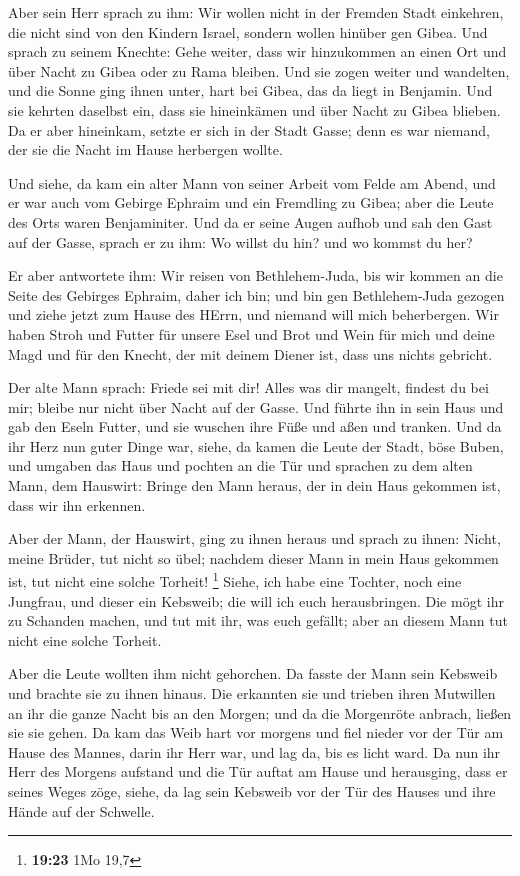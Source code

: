  Aber sein Herr sprach zu ihm: Wir wollen nicht in der
Fremden Stadt einkehren, die nicht sind von den Kindern Israel, sondern
wollen hinüber gen Gibea.  Und sprach zu seinem Knechte:
Gehe weiter, dass wir hinzukommen an einen Ort und über Nacht zu Gibea
oder zu Rama bleiben.  Und sie zogen weiter und wandelten,
und die Sonne ging ihnen unter, hart bei Gibea, das da liegt in
Benjamin.  Und sie kehrten daselbst ein, dass sie
hineinkämen und über Nacht zu Gibea blieben. Da er aber hineinkam,
setzte er sich in der Stadt Gasse; denn es war niemand, der sie die
Nacht im Hause herbergen wollte.

 Und siehe, da kam ein alter Mann von seiner Arbeit vom
Felde am Abend, und er war auch vom Gebirge Ephraim und ein Fremdling zu
Gibea; aber die Leute des Orts waren Benjaminiter.  Und da
er seine Augen aufhob und sah den Gast auf der Gasse, sprach er zu ihm:
Wo willst du hin? und wo kommst du her?

 Er aber antwortete ihm: Wir reisen von Bethlehem-Juda, bis
wir kommen an die Seite des Gebirges Ephraim, daher ich bin; und bin gen
Bethlehem-Juda gezogen und ziehe jetzt zum Hause des HErrn, und niemand
will mich beherbergen.  Wir haben Stroh und Futter für
unsere Esel und Brot und Wein für mich und deine Magd und für den
Knecht, der mit deinem Diener ist, dass uns nichts gebricht.

 Der alte Mann sprach: Friede sei mit dir! Alles was dir
mangelt, findest du bei mir; bleibe nur nicht über Nacht auf der Gasse.
 Und führte ihn in sein Haus und gab den Eseln Futter, und
sie wuschen ihre Füße und aßen und tranken.  Und da ihr
Herz nun guter Dinge war, siehe, da kamen die Leute der Stadt, böse
Buben, und umgaben das Haus und pochten an die Tür und sprachen zu dem
alten Mann, dem Hauswirt: Bringe den Mann heraus, der in dein Haus
gekommen ist, dass wir ihn erkennen.

 Aber der Mann, der Hauswirt, ging zu ihnen heraus und
sprach zu ihnen: Nicht, meine Brüder, tut nicht so übel; nachdem dieser
Mann in mein Haus gekommen ist, tut nicht eine solche Torheit!
\footnote{\textbf{19:23} 1Mo 19,7}  Siehe, ich habe eine
Tochter, noch eine Jungfrau, und dieser ein Kebsweib; die will ich euch
herausbringen. Die mögt ihr zu Schanden machen, und tut mit ihr, was
euch gefällt; aber an diesem Mann tut nicht eine solche Torheit.

 Aber die Leute wollten ihm nicht gehorchen. Da fasste der
Mann sein Kebsweib und brachte sie zu ihnen hinaus. Die erkannten sie
und trieben ihren Mutwillen an ihr die ganze Nacht bis an den Morgen;
und da die Morgenröte anbrach, ließen sie sie gehen.  Da
kam das Weib hart vor morgens und fiel nieder vor der Tür am Hause des
Mannes, darin ihr Herr war, und lag da, bis es licht ward. 
Da nun ihr Herr des Morgens aufstand und die Tür auftat am Hause und
herausging, dass er seines Weges zöge, siehe, da lag sein Kebsweib vor
der Tür des Hauses und ihre Hände auf der Schwelle.

